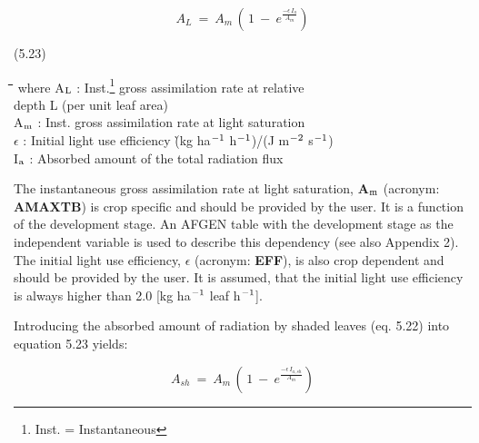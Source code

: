\documentclass[11pt]{article}
\begin{document}
\begin{displaymath}
A _{L} ~=~ A _{m} \, (\, 1~-~ e ^{{\frac{ - \epsilon\, I _{a} }{ A _{m} }} } )
\end{displaymath}

 \bigskip
\strut\hfill (5.23)

\nwln
\begin{tabbing}
\hspace{1.27cm}\=\hspace{1.27cm}\=\hspace{1.27cm}\=\hspace{1.27cm}\=%
\hspace{1.27cm}\=\hspace{1.27cm}\=\hspace{1.27cm}\=\hspace{1.27cm}\=%
\hspace{1.27cm}\=\hspace{1.27cm}\=\kill
where\> A$_{{\rm L}}$\> : Inst.\footnote{ Inst. = Instantaneous} gross assimilation rate at relative\\
\>\>   depth L (per unit leaf area)\> \> \> \> \> \> \> \> [kg ha$^{{\rm -1}}$ h$^{{\rm -1}}$]\\
\>A$_{{\rm m}}$\> : Inst. gross assimilation rate at light saturation\> \> \> \> \> \> \> \> [kg ha$^{{\rm -1}}$ h$^{{\rm -1}}$]\\
\>$\epsilon$\> : Initial light use efficiency\> \> \> \> \> \> \`(kg ha$^{{\rm -1}}$ h$^{{\rm -1}}$)/(J m$^{{\rm -2}}$ s$^{{\rm -1}}$)\\
\>I$_{{\rm a}}$\> : Absorbed amount of the total radiation flux\> \> \> \> \> \> \> \> [J m$^{{\rm -2}}$ s$^{{\rm -1}}$]
\end{tabbing}

\bigskip
\bigskip
The instantaneous gross assimilation rate at light saturation, {\bf A$_{{\rm m}}$} (acronym: {\bf AMAXTB}) is
crop specific and should be provided by the user. It is a function of the development
stage. An AFGEN table with the development stage as the independent variable is used to
describe this dependency (see also Appendix 2). The initial light use efficiency, {\bf $\epsilon$}
(acronym: {\bf EFF}), is also crop dependent and should be provided by the user. It is
assumed, that the initial light use efficiency is always higher than 2.0 [kg ha$^{{\rm -1}}$ leaf h$^{{\rm -1}}$]. 

\bigskip
\bigskip
Introducing the absorbed amount of radiation by shaded leaves (eq. 5.22) into equation
5.23 yields:

\begin{displaymath}
A _{sh} ~=~ A _{m} \, (\, 1~-~ e ^{{\frac{ - \epsilon\, I _{a,sh} }{ A _{m} }} } )
\end{displaymath}
\end{document}
